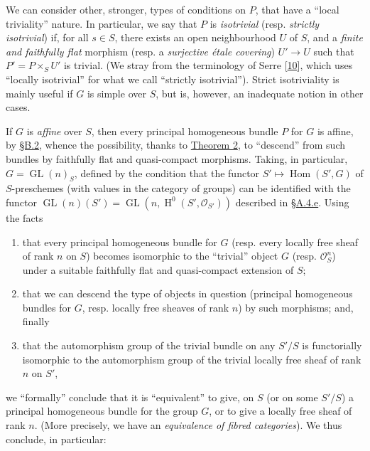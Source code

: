 \documentclass{article}
\newcommand{\oldpage}[1]{\marginpar{\footnotesize$\Big\vert$ \textit{p.~#1}}}
\theoremstyle{definition}
\theoremstyle{definition}
\theoremstyle{definition}
\theoremstyle{definition}
\theoremstyle{remark}
\begin{document}
We can consider other, stronger, types of conditions on \(P\), that have a ``local triviality'' nature.
In particular, we say that \(P\) is \emph{isotrivial} (resp. \emph{strictly isotrivial}) if, for all \(s\in S\), there exists an open neighbourhood \(U\) of \(S\), and a \emph{finite and faithfully flat} morphism (resp. a \emph{surjective étale covering}) \(U'\to U\) such that \(P'=P\times_S U'\) is trivial.
(We stray from the terminology of Serre {[}\protect\hyperlink{ref-GD1960}{10}{]}, which uses ``locally isotrivial'' for what we call ``strictly isotrivial'').
Strict isotriviality is mainly useful if \(G\) is simple over \(S\), but is, however, an inadequate notion in other cases.

If \(G\) is \emph{affine} over \(S\), then every principal homogeneous bundle \(P\) for \(G\) is affine, by \protect\hyperlink{fga-3-i-section-B.2}{§B.2}, whence the possibility, thanks to \protect\hyperlink{fga-3-i-section-B.1-theorem-2}{Theorem 2}, to ``descend'' from such bundles by faithfully flat and quasi-compact morphisms.
\oldpage{190-28}Taking, in particular, \(G=\operatorname{GL}(n)_S\), defined by the condition that the functor \(S'\mapsto\operatorname{Hom}(S',G)\) of \(S\)-preschemes (with values in the category of groups) can be identified with the functor \(\operatorname{GL}(n)(S')=\operatorname{GL}(n,\operatorname{H}^0(S',{\mathscr{O}}_{S'}))\) described in \protect\hyperlink{fga-3-i-section-A.4}{§A.4.e}.
Using the facts

\begin{enumerate}
\def\labelenumi{\roman{enumi}.}
\item
  that every principal homogeneous bundle for \(G\) (resp. every locally free sheaf of rank \(n\) on \(S\)) becomes isomorphic to the ``trivial'' object \(G\) (resp. \({\mathscr{O}}_S^n\)) under a suitable faithfully flat and quasi-compact extension of \(S\);
\item
  that we can descend the type of objects in question (principal homogeneous bundles for \(G\), resp. locally free sheaves of rank \(n\)) by such morphisms; and, finally
\item
  that the automorphism group of the trivial bundle on any \(S'/S\) is functorially isomorphic to the automorphism group of the trivial locally free sheaf of rank \(n\) on \(S'\),
\end{enumerate}

we ``formally'' conclude that it is ``equivalent'' to give, on \(S\) (or on some \(S'/S\)) a principal homogeneous bundle for the group \(G\), or to give a locally free sheaf of rank \(n\).
(More precisely, we have an \emph{equivalence of fibred categories}).
We thus conclude, in particular:
\end{document}
